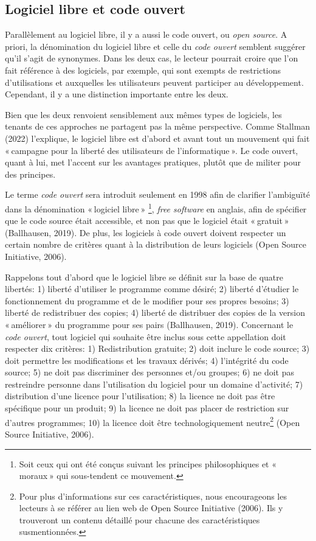 \documentclass[
  letterpaper,
  DIV=11,
  numbers=noendperiod]{scrreprt}
\begin{document}
\hypertarget{logiciel-libre-et-code-ouvert}{%
\subsection{Logiciel libre et code
ouvert}\label{logiciel-libre-et-code-ouvert}}

Parallèlement au logiciel libre, il y a aussi le code ouvert, ou
\emph{open source}. A priori, la dénomination du logiciel libre et celle
du \emph{code ouvert} semblent suggérer qu'il s'agit de synonymes. Dans
les deux cas, le lecteur pourrait croire que l'on fait référence à des
logiciels, par exemple, qui sont exempts de restrictions d'utilisations
et auxquelles les utilisateurs peuvent participer au développement.
Cependant, il y a une distinction importante entre les deux.

Bien que les deux renvoient sensiblement aux mêmes types de logiciels,
les tenants de ces approches ne partagent pas la même perspective. Comme
Stallman (2022) l'explique, le logiciel libre est d'abord et avant tout
un mouvement qui fait « campagne pour la liberté des utilisateurs de
l'informatique ». Le code ouvert, quant à lui, met l'accent sur les
avantages pratiques, plutôt que de militer pour des principes.

Le terme \emph{code ouvert} sera introduit seulement en 1998 afin de
clarifier l'ambiguïté dans la dénomination « logiciel libre »
\footnote{Soit ceux qui ont été conçus suivant les principes
  philosophiques et « moraux » qui sous-tendent ce mouvement.},
\emph{free software} en anglais, afin de spécifier que le code source
était accessible, et non pas que le logiciel était « gratuit »
(Ballhausen, 2019). De plus, les logiciels à code ouvert doivent
respecter un certain nombre de critères quant à la distribution de leurs
logiciels (Open Source Initiative, 2006).

Rappelons tout d'abord que le logiciel libre se définit sur la base de
quatre libertés: 1) liberté d'utiliser le programme comme désiré; 2)
liberté d'étudier le fonctionnement du programme et de le modifier pour
ses propres besoins; 3) liberté de redistribuer des copies; 4) liberté
de distribuer des copies de la version « améliorer » du programme pour
ses pairs (Ballhausen, 2019). Concernant le \emph{code ouvert}, tout
logiciel qui souhaite être inclus sous cette appellation doit respecter
dix critères: 1) Redistribution gratuite; 2) doit inclure le code
source; 3) doit permettre les modifications et les travaux dérivés; 4)
l'intégrité du code source; 5) ne doit pas discriminer des personnes
et/ou groupes; 6) ne doit pas restreindre personne dans l'utilisation du
logiciel pour un domaine d'activité; 7) distribution d'une licence pour
l'utilisation; 8) la licence ne doit pas être spécifique pour un
produit; 9) la licence ne doit pas placer de restriction sur d'autres
programmes; 10) la licence doit être technologiquement neutre\footnote{Pour
  plus d'informations sur ces caractéristiques, nous encourageons les
  lecteurs à se référer au lien web de Open Source Initiative (2006).
  Ils y trouveront un contenu détaillé pour chacune des caractéristiques
  susmentionnées.} (Open Source Initiative, 2006).
\end{document}
